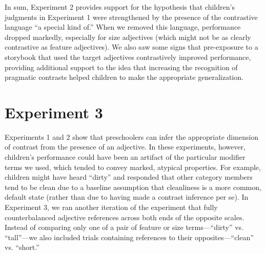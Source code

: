 \documentclass[man]{apa2}
\begin{document}

In sum, Experiment 2 provides support for the hypothesis that children's judgments in Experiment 1 were strengthened by the presence of the contrastive language ``a special kind of.'' When we removed this language, performance dropped markedly, especially for size adjectives (which might not be as clearly contrastive as feature adjectives). We also saw some signs that pre-exposure to a storybook that used the target adjectives contrastively improved performance, providing additional support to the idea that increasing the recognition of pragmatic contrasts helped children to make the appropriate generalization. 




\section{Experiment 3} 

Experiments 1 and 2 show that preschoolers can infer the appropriate dimension of contrast from the presence of an adjective. In these experiments, however, children's performance could have been an artifact of the particular modifier terms we used, which tended to convey marked, atypical properties. For example, children might have heard ``dirty'' and responded that other category members tend to be clean due to a baseline assumption that cleanliness is a more common, default state (rather than due to having made a contrast inference per se). In Experiment 3, we ran another iteration of the experiment that fully counterbalanced adjective references across both ends of the opposite scales. Instead of comparing only one of a pair of feature or size terms---``dirty'' vs. ``tall''---we also included trials containing references to their opposites---``clean'' vs. ``short.''  
\end{document}
